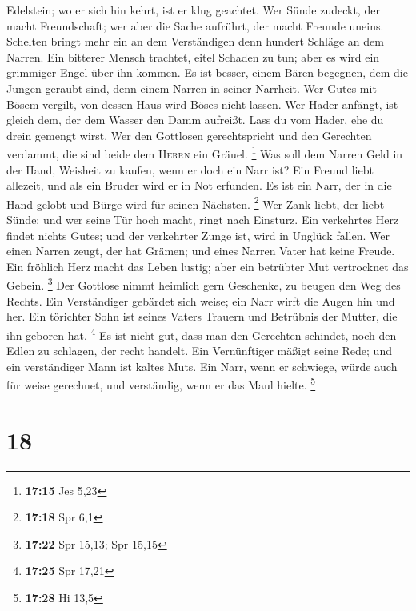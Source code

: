 Edelstein; wo er sich hin kehrt, ist er klug geachtet. 
Wer Sünde zudeckt, der macht Freundschaft; wer aber die Sache aufrührt,
der macht Freunde uneins.  Schelten bringt mehr ein an
dem Verständigen denn hundert Schläge an dem Narren.  Ein
bitterer Mensch trachtet, eitel Schaden zu tun; aber es wird ein
grimmiger Engel über ihn kommen.  Es ist besser, einem
Bären begegnen, dem die Jungen geraubt sind, denn einem Narren in seiner
Narrheit.  Wer Gutes mit Bösem vergilt, von dessen Haus
wird Böses nicht lassen.  Wer Hader anfängt, ist gleich
dem, der dem Wasser den Damm aufreißt. Lass du vom Hader, ehe du drein
gemengt wirst.  Wer den Gottlosen gerechtspricht und den
Gerechten verdammt, die sind beide dem \textsc{Herrn} ein Gräuel.
\footnote{\textbf{17:15} Jes 5,23}  Was soll dem Narren
Geld in der Hand, Weisheit zu kaufen, wenn er doch ein Narr ist?
 Ein Freund liebt allezeit, und als ein Bruder wird er in
Not erfunden.  Es ist ein Narr, der in die Hand gelobt
und Bürge wird für seinen Nächsten. \footnote{\textbf{17:18} Spr 6,1}
 Wer Zank liebt, der liebt Sünde; und wer seine Tür hoch
macht, ringt nach Einsturz.  Ein verkehrtes Herz findet
nichts Gutes; und der verkehrter Zunge ist, wird in Unglück fallen.
 Wer einen Narren zeugt, der hat Grämen; und eines Narren
Vater hat keine Freude.  Ein fröhlich Herz macht das
Leben lustig; aber ein betrübter Mut vertrocknet das Gebein. \footnote{\textbf{17:22}
  Spr 15,13; Spr 15,15}  Der Gottlose nimmt heimlich gern
Geschenke, zu beugen den Weg des Rechts.  Ein
Verständiger gebärdet sich weise; ein Narr wirft die Augen hin und her.
 Ein törichter Sohn ist seines Vaters Trauern und
Betrübnis der Mutter, die ihn geboren hat. \footnote{\textbf{17:25} Spr
  17,21}  Es ist nicht gut, dass man den Gerechten
schindet, noch den Edlen zu schlagen, der recht handelt. 
Ein Vernünftiger mäßigt seine Rede; und ein verständiger Mann ist kaltes
Muts.  Ein Narr, wenn er schwiege, würde auch für weise
gerechnet, und verständig, wenn er das Maul hielte. \footnote{\textbf{17:28}
  Hi 13,5}

\hypertarget{section-7}{%
\section{18}\label{section-7}}

